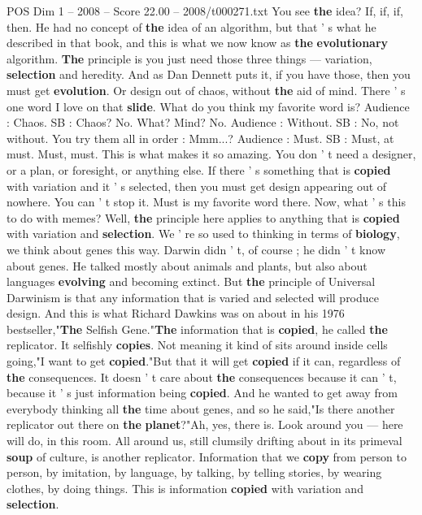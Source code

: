 \begin{textsample}{POS Dim 1 – 2008 – Score 22.00 – 2008/t000271.txt}
You see \textbf{the} idea?
If, if, if, then.
He had no concept of \textbf{the} idea of an algorithm, but that ' s what he described in that book, and this is what we now know as \textbf{the} \textbf{evolutionary} algorithm. \textbf{The} principle is you just need those three things — variation, \textbf{selection} and heredity.
And as Dan Dennett puts it, if you have those, then you must get \textbf{evolution}.
Or design out of chaos, without \textbf{the} aid of mind.
There ' s one word I love on that \textbf{slide}.
What do you think my favorite word is?
Audience : Chaos.
SB : Chaos?
No.
What?
Mind?
No.
Audience : Without.
SB : No, not without.
You try them all in order : Mmm...?
Audience : Must.
SB : Must, at must.
Must, must.
This is what makes it so amazing.
You don ' t need a designer, or a plan, or foresight, or anything else.
If there ' s something that is \textbf{copied} with variation and it ' s selected, then you must get design appearing out of nowhere.
You can ' t stop it.
Must is my favorite word there.
Now, what ' s this to do with memes?
Well, \textbf{the} principle here applies to anything that is \textbf{copied} with variation and \textbf{selection}.
We ' re so used to thinking in terms of \textbf{biology}, we think about genes this way.
Darwin didn ' t, of course ; he didn ' t know about genes.
He talked mostly about animals and plants, but also about languages \textbf{evolving} and becoming extinct.
But \textbf{the} principle of Universal Darwinism is that any information that is varied and selected will produce design.
And this is what Richard Dawkins was on about in his 1976 bestseller,"\textbf{The} Selfish Gene."\textbf{The} information that is \textbf{copied}, he called \textbf{the} replicator.
It selfishly \textbf{copies}.
Not meaning it kind of sits around inside cells going,"I want to get \textbf{copied}."But that it will get \textbf{copied} if it can, regardless of \textbf{the} consequences.
It doesn ' t care about \textbf{the} consequences because it can ' t, because it ' s just information being \textbf{copied}.
And he wanted to get away from everybody thinking all \textbf{the} time about genes, and so he said,"Is there another replicator out there on \textbf{the} \textbf{planet}?"Ah, yes, there is.
Look around you — here will do, in this room.
All around us, still clumsily drifting about in its primeval \textbf{soup} of culture, is another replicator.
Information that we \textbf{copy} from person to person, by imitation, by language, by talking, by telling stories, by wearing clothes, by doing things.
This is information \textbf{copied} with variation and \textbf{selection}.

\end{textsample}
